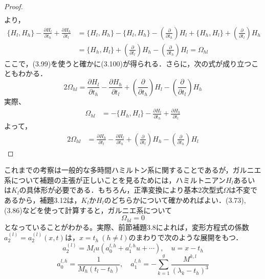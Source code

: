 \documentclass[paper=a4, fontsize=11pt]{jlreq} %
\newenvironment{story}{%
  \begin{mdframed}[
    backgroundcolor=red!5, %
    linewidth=0pt,         %
    innertopmargin=10pt,   %
    innerbottommargin=10pt,
    innerrightmargin=10pt, %
    innerleftmargin=10pt
  ]%
}{%
  \end{mdframed}%
}
\theoremstyle{break}
\theoremstyle{qa}
\begin{document}
\begin{story}
\begin{proof}
\begin{align*}
\end{align*}
より，
\begin{align*}
    \lbrace H_l, H_h \rbrace - \frac{\partial H_l}{\partial t_h} + \frac{\partial H_h}{\partial t_l} &= \lbrace H_l, H_h \rbrace - \lbrace H_l, H_h \rbrace - \left( \frac{\partial}{\partial t_h} \right) H_l + \lbrace H_h, H_l \rbrace + \left( \frac{\partial}{\partial t_l} \right) H_h \\
    &= \lbrace H_h, H_l \rbrace + \left( \frac{\partial}{\partial t_l} \right) H_h - \left( \frac{\partial}{\partial t_h} \right) H_l = \Omega_{hl}
\end{align*}
ここで，(3.99)を使うと確かに(3.100)が得られる．さらに，次の式が成り立つこともわかる．
\begin{equation}
    2\Omega_{hl} = \frac{\partial H_l}{\partial t_h} - \frac{\partial H_h}{\partial t_l} + \left( \frac{\partial}{\partial t_h} \right) H_l - \left( \frac{\partial}{\partial t_l} \right) H_h \tag{3.102}
\end{equation}
実際、
\begin{align*}
    \Omega_{hl} &= - \lbrace H_h, H_l \rbrace - \frac{\partial H_l}{\partial t_h} + \frac{\partial H_h}{\partial t_l}
\end{align*}
よって，
\begin{align*}
    2\Omega_{hl} &= \frac{\partial H_h}{\partial t_l} - \frac{\partial H_l}{\partial t_h} + \left( \frac{\partial}{\partial t_l} \right) H_h - \left( \frac{\partial}{\partial t_h} \right) H_l
\end{align*}
\end{proof}

これまでの考察は一般的な多時間ハミルトン系に関することであるが，ガルニエ系について補題の主張が正しいことを見るためには，ハミルトニアン$H_l$あるいは$K_l$の具体形が必要である．もちろん，正準変換により基本2次型式$\Omega$は不変であるから，補題3.12は，$K_l$か$H_l$のどちらかについて確かめればよい．(3.73), (3.86)などを使って計算すると，ガルニエ系について
\begin{equation*}
    \Omega_{hl} = 0
\end{equation*}
となっていることがわかる。実際、前節補題3.8によれば，変形方程式の係数$a_2^{(l)} = a_2^{(l)}(x,t)$は，$x=t_h \ (h \neq l)$のまわりで次のような展開をもつ．
\begin{equation*}
    a_2^{(l)} = M_l u(a_0^{l,h} + a_1^{l,h}u + \cdots), \quad u = x - t_h
\end{equation*}
\begin{equation*}
    a_0^{l,h} = \frac{1}{M_h(t_l - t_h)}, \quad a_1^{l,h} = - \sum_{k=1}^g \frac{M^{k,l}}{(\lambda_k - t_h)^3}
\end{equation*}
\end{story}
\end{document}
